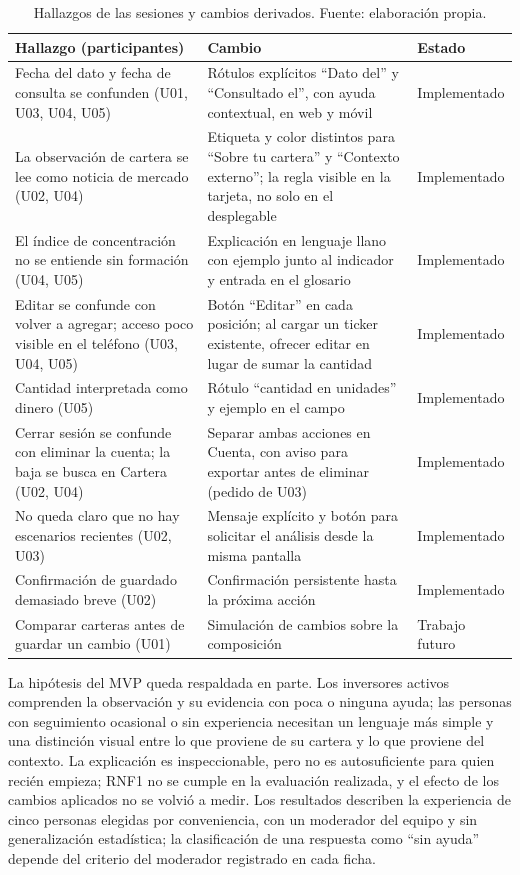\begin{table}[ht]
\centering\small\renewcommand{\arraystretch}{1.15}
\caption{Hallazgos de las sesiones y cambios derivados. Fuente: elaboración propia.}\label{tab:sesiones-cambios}
\begin{tabular}{>{\raggedright\arraybackslash}p{4.6cm}>{\raggedright\arraybackslash}p{6.4cm}>{\raggedright\arraybackslash}p{2.6cm}}\hline
\textbf{Hallazgo (participantes)} & \textbf{Cambio} & \textbf{Estado}\\\hline
Fecha del dato y fecha de consulta se confunden (U01, U03, U04, U05) & Rótulos explícitos \enquote{Dato del} y \enquote{Consultado el}, con ayuda contextual, en web y móvil & Implementado\\
La observación de cartera se lee como noticia de mercado (U02, U04) & Etiqueta y color distintos para \enquote{Sobre tu cartera} y \enquote{Contexto externo}; la regla visible en la tarjeta, no solo en el desplegable & Implementado\\
El índice de concentración no se entiende sin formación (U04, U05) & Explicación en lenguaje llano con ejemplo junto al indicador y entrada en el glosario & Implementado\\
Editar se confunde con volver a agregar; acceso poco visible en el teléfono (U03, U04, U05) & Botón \enquote{Editar} en cada posición; al cargar un ticker existente, ofrecer editar en lugar de sumar la cantidad & Implementado\\
Cantidad interpretada como dinero (U05) & Rótulo \enquote{cantidad en unidades} y ejemplo en el campo & Implementado\\
Cerrar sesión se confunde con eliminar la cuenta; la baja se busca en Cartera (U02, U04) & Separar ambas acciones en Cuenta, con aviso para exportar antes de eliminar (pedido de U03) & Implementado\\
No queda claro que no hay escenarios recientes (U02, U03) & Mensaje explícito y botón para solicitar el análisis desde la misma pantalla & Implementado\\
Confirmación de guardado demasiado breve (U02) & Confirmación persistente hasta la próxima acción & Implementado\\
Comparar carteras antes de guardar un cambio (U01) & Simulación de cambios sobre la composición & Trabajo futuro\\\hline
\end{tabular}
\end{table}

La hipótesis del MVP queda respaldada en parte. Los inversores activos comprenden la observación y su evidencia con poca o ninguna ayuda; las personas con seguimiento ocasional o sin experiencia necesitan un lenguaje más simple y una distinción visual entre lo que proviene de su cartera y lo que proviene del contexto. La explicación es inspeccionable, pero no es autosuficiente para quien recién empieza; RNF1 no se cumple en la evaluación realizada, y el efecto de los cambios aplicados no se volvió a medir. Los resultados describen la experiencia de cinco personas elegidas por conveniencia, con un moderador del equipo y sin generalización estadística; la clasificación de una respuesta como \enquote{sin ayuda} depende del criterio del moderador registrado en cada ficha.

